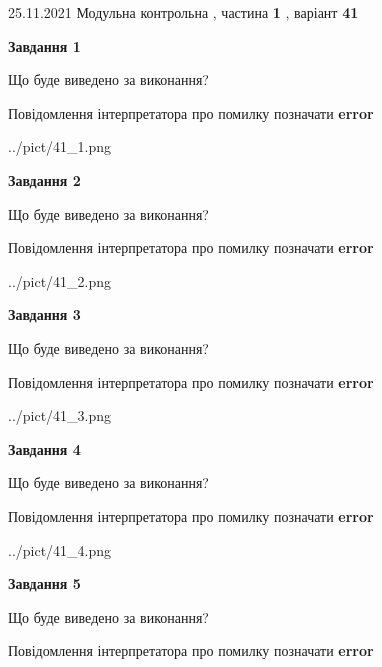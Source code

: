 \documentclass[10pt, ukrainian]{article}
\begin{document}
{25.11.2021 Модульна контрольна , частина \textbf { 1 }, варіант  \No \textbf { 41 }\par}
{
\begin {large}

{\begin {center}\textbf{Завдання 1}\end {center}}\par
Що буде виведено за виконання? \par
Повідомлення інтерпретатора про помилку позначати \textbf{error}

\begin{center}
	{../pict/41_1.png}
\end{center}
\newpage

{\begin {center}\textbf{Завдання 2}\end {center}}\par
Що буде виведено за виконання? \par
Повідомлення інтерпретатора про помилку позначати \textbf{error}

\begin{center}
	{../pict/41_2.png}
\end{center}
\newpage

{\begin {center}\textbf{Завдання 3}\end {center}}\par
Що буде виведено за виконання? \par
Повідомлення інтерпретатора про помилку позначати \textbf{error}

\begin{center}
	{../pict/41_3.png}
\end{center}
\newpage

{\begin {center}\textbf{Завдання 4}\end {center}}\par
Що буде виведено за виконання? \par
Повідомлення інтерпретатора про помилку позначати \textbf{error}

\begin{center}
	{../pict/41_4.png}
\end{center}
\newpage

{\begin {center}\textbf{Завдання 5}\end {center}}\par
Що буде виведено за виконання? \par
Повідомлення інтерпретатора про помилку позначати \textbf{error}


\end{large}}
\end{document}
